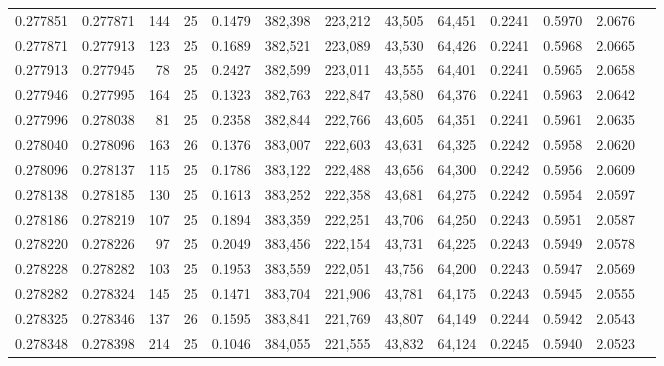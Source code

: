 \begin{tabular}{rrrrrrrrrrrrr}
0.277851 & 0.277871 &   144 &  25 &                                     0.1479 & 382,398 & 223,212 &  43,505 &  64,451 & 0.2241 & 0.5970 & 2.0676 \\
0.277871 & 0.277913 &   123 &  25 &                                     0.1689 & 382,521 & 223,089 &  43,530 &  64,426 & 0.2241 & 0.5968 & 2.0665 \\
0.277913 & 0.277945 &    78 &  25 &                                     0.2427 & 382,599 & 223,011 &  43,555 &  64,401 & 0.2241 & 0.5965 & 2.0658 \\
0.277946 & 0.277995 &   164 &  25 &                                     0.1323 & 382,763 & 222,847 &  43,580 &  64,376 & 0.2241 & 0.5963 & 2.0642 \\
0.277996 & 0.278038 &    81 &  25 &                                     0.2358 & 382,844 & 222,766 &  43,605 &  64,351 & 0.2241 & 0.5961 & 2.0635 \\
0.278040 & 0.278096 &   163 &  26 &                                     0.1376 & 383,007 & 222,603 &  43,631 &  64,325 & 0.2242 & 0.5958 & 2.0620 \\
0.278096 & 0.278137 &   115 &  25 &                                     0.1786 & 383,122 & 222,488 &  43,656 &  64,300 & 0.2242 & 0.5956 & 2.0609 \\
0.278138 & 0.278185 &   130 &  25 &                                     0.1613 & 383,252 & 222,358 &  43,681 &  64,275 & 0.2242 & 0.5954 & 2.0597 \\
0.278186 & 0.278219 &   107 &  25 &                                     0.1894 & 383,359 & 222,251 &  43,706 &  64,250 & 0.2243 & 0.5951 & 2.0587 \\
0.278220 & 0.278226 &    97 &  25 &                                     0.2049 & 383,456 & 222,154 &  43,731 &  64,225 & 0.2243 & 0.5949 & 2.0578 \\
0.278228 & 0.278282 &   103 &  25 &                                     0.1953 & 383,559 & 222,051 &  43,756 &  64,200 & 0.2243 & 0.5947 & 2.0569 \\
0.278282 & 0.278324 &   145 &  25 &                                     0.1471 & 383,704 & 221,906 &  43,781 &  64,175 & 0.2243 & 0.5945 & 2.0555 \\
0.278325 & 0.278346 &   137 &  26 &                                     0.1595 & 383,841 & 221,769 &  43,807 &  64,149 & 0.2244 & 0.5942 & 2.0543 \\
0.278348 & 0.278398 &   214 &  25 &                                     0.1046 & 384,055 & 221,555 &  43,832 &  64,124 & 0.2245 & 0.5940 & 2.0523 \\

\end{tabular}
